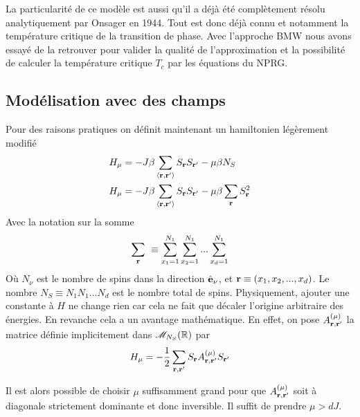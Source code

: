 \documentclass[10pt]{article}
\begin{document}
\begin{multicols}{2}
La particularité de ce modèle est aussi qu'il a déjà été complètement résolu analytiquement par Onsager \cite{Onsager} en 1944. Tout est donc déjà connu et notamment la température critique de la transition de phase. Avec l'approche BMW nous avons essayé de la retrouver pour valider la qualité de l'approximation et la possibilité de calculer la température critique $T_c$ par les équations du NPRG. 


\subsection{Modélisation avec des champs}

Pour des raisons pratiques on définit maintenant un hamiltonien légèrement modifié
\begin{align}
  H_\mu &= -J\beta \sum_{\left<{\bf r}, {\bf r}'\right>}S_{\bf r} S_{{\bf r}'} - \mu \beta N_S \\
  H_\mu  &= -J\beta \sum_{\left<{\bf r}, {\bf r}'\right>}S_{\bf r} S_{{\bf r}'} - \mu \beta \sum_{\bf r} S_{\bf r}^2 
\end{align}
Avec la notation sur la somme 
\begin{equation}
\sum_{\bf r} \,\, \equiv \sum_{x_1=1}^{N_1}\sum_{x_2=1}^{N_1} ... \sum_{x_d=1}^{N_1} 
\end{equation}
Où $N_\nu$ est le nombre de spins dans la direction $\hat{\mathbf{e}}_\nu$, et ${\bf r} \equiv (x_1, x_2, ..., x_d)$. Le nombre $N_S \equiv N_1N_1...N_d$ est le nombre total de spins. Physiquement, ajouter une constante à $H$ ne change rien car cela ne fait que décaler l'origine arbitraire des énergies. En revanche cela a un avantage mathématique. En effet, on pose $A_{{\bf r}, {\bf r}'}^{(\mu)}$ la matrice définie implicitement dans $\mathscr{M}_{N_S}(\mathbb{R})$ par
\begin{equation}
  H_\mu  = -\frac{1}{2} \sum_{{\bf r}, {\bf r}'} S_{\bf r} A_{{\bf r}, {\bf r}'}^{(\mu)}S_{{\bf r}'}
\end{equation}

Il est alors possible de choisir $\mu$ suffisamment grand pour que $A_{{\bf r}, {\bf r}'}^{(\mu)}$ soit à diagonale strictement dominante et donc inversible. Il suffit de prendre $\mu > dJ$. \\


\end{multicols}
\end{document}
